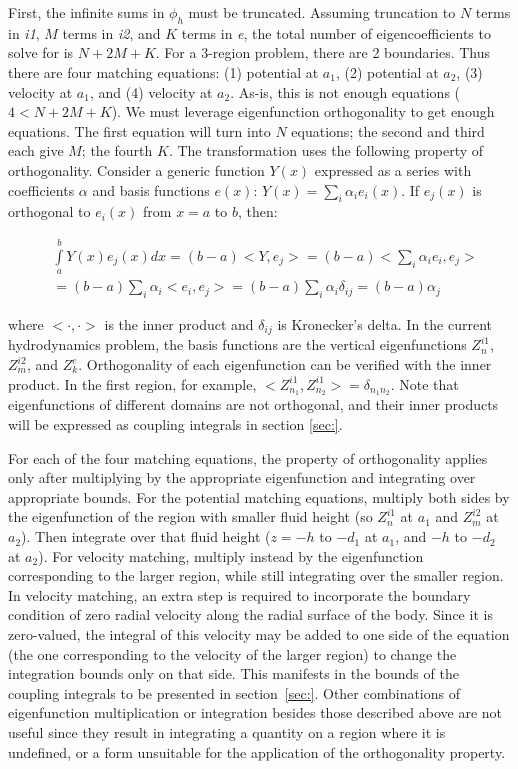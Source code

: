 \begin{appendices}
First, the infinite sums in $\phi_h$ must be truncated.
Assuming truncation to $N$ terms in \textit{i1}, $M$ terms in \textit{i2}, and $K$ terms in \textit{e}, the total number of eigencoefficients to solve for is $N+2M+K$.
For a 3-region problem, there are 2 boundaries.
Thus there are four matching equations: (1) potential at $a_1$, (2) potential at $a_2$, (3) velocity at $a_1$, and (4) velocity at $a_2$.
As-is, this is not enough equations ($4 < N+2M+K$).
We must leverage eigenfunction orthogonality to get enough equations.
The first equation will turn into $N$ equations; the second and third each give $M$; the fourth $K$.
The transformation uses the following property of orthogonality.
Consider a generic function $Y(x)$ expressed as a series with coefficients $\alpha$ and basis functions $e(x)$: $Y(x)=\sum_i \alpha_i e_i(x)$.
If $e_j(x)$ is orthogonal to $e_i(x)$ from $x = a$ to $b$, then:

\begin{equation}
\begin{aligned}
       & \int\limits_a^b Y(x)e_j(x)dx = (b-a) <Y,e_j>=(b-a)<\sum_i \alpha_i e_i, e_j> \\ &= (b-a) \sum_i \alpha_i <e_i,e_j> = (b-a) \sum_i \alpha_i \delta_{ij} = (b-a) \alpha_j
\end{aligned}
\end{equation}

where $<\cdot,\cdot>$ is the inner product and $\delta_{ij}$ is Kronecker’s delta.
In the current hydrodynamics problem, the basis functions are the vertical eigenfunctions $Z_n^{i1}$, $Z_m^{i2}$, and $Z_k^{e}$.
Orthogonality of each eigenfunction can be verified with the inner product.
In the first region, for example, $<Z_{n_1}^{i1},Z_{n_2}^{i1}>=\delta_{n_1n_2}$.
Note that eigenfunctions of different domains are not orthogonal, and their inner products will be expressed as coupling integrals in section \ref{sec:}.

For each of the four matching equations, the property of orthogonality applies only after multiplying by the appropriate eigenfunction and integrating over appropriate bounds.
For the potential matching equations, multiply both sides by the eigenfunction of the region with smaller fluid height (so $Z_n^{i1}$ at $a_1$ and $Z_m^{i2}$ at $a_2$).
Then integrate over that fluid height ($z=-h$ to $-d_1$ at $a_1$, and $-h$ to $-d_2$ at $a_2$).
For velocity matching, multiply instead by the eigenfunction corresponding to the larger region, while still integrating over the smaller region.
In velocity matching, an extra step is required to incorporate the boundary condition of zero radial velocity along the radial surface of the body.
Since it is zero-valued, the integral of this velocity may be added to one side of the equation (the one corresponding to the velocity of the larger region) to change the integration bounds only on that side.
This manifests in the bounds of the coupling integrals to be presented in section~\ref{sec:}.
Other combinations of eigenfunction multiplication or integration besides those described above are not useful since they result in integrating a quantity on a region where it is undefined, or a form unsuitable for the application of the orthogonality property.


\end{appendices}
